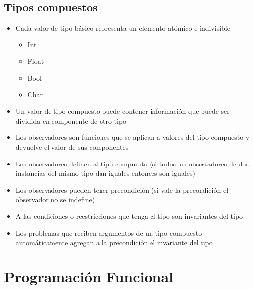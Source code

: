 \documentclass[a4paper,10pt]{article}
\begin{document}
\subsection{Tipos compuestos}
	\begin{itemize}
		\item Cada valor de tipo básico representa un elemento atómico e indivisible
		\begin{itemize}
			\item Int
			\item Float
			\item Bool 
			\item Char
		\end{itemize}
		\item Un valor de tipo compuesto puede contener información que puede ser dividida en componente de otro tipo
		\item Los observadores son funciones que se aplican a valores del tipo compuesto y devuelve el valor de sus componentes
		\item Los observadores definen al tipo compuesto (si todos los observadores de dos instancias del mismo tipo dan iguales entonces son iguales)
		\item Los observadores pueden tener precondición (si vale la precondición el observador no se indefine)
		\item A las condiciones o reestricciones que tenga el tipo son invariantes del tipo
		\item Los problemas que reciben argumentos de un tipo compuesto automáticamente agregan a la precondición el invariante del tipo
	\end{itemize}
\section{Programación Funcional}
\end{document}

